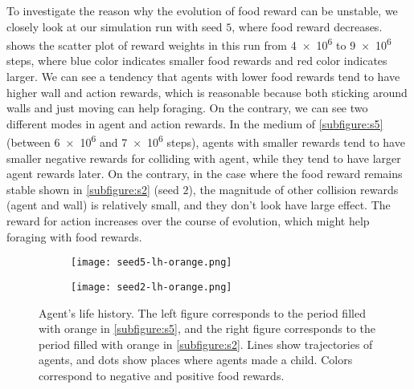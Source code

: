 To investigate the reason why the evolution of food reward can be unstable, we closely look at our simulation run with seed $5$, where food reward decreases.  shows the scatter plot of reward weights in this run from \num{4e6} to \num{9e6} steps, where blue color indicates smaller food rewards and red color indicates larger. We can see a tendency that agents with lower food rewards tend to have higher wall and action rewards, which is reasonable because both sticking around walls and just moving can help foraging. On the contrary, we can see two different modes in agent and action rewards. In the medium of \cref{subfigure:s5} (between \num{6e6} and \num{7e6} steps), agents with smaller rewards tend to have smaller negative rewards for colliding with agent, while they tend to have larger agent rewards later. On the contrary, in the case where the food reward remains stable shown in \cref{subfigure:s2} (seed $2$), the magnitude of other collision rewards (agent and wall) is relatively small, and they don't look have large effect. The reward for action increases over the course of evolution, which might help foraging with food rewards.

\begin{figure}[t]
  \begin{subfigure}[t]{7cm}
    \centering
    \texttt{[image: seed5-lh-orange.png]}
    \label{subfigure:s5lh}
  \end{subfigure}
  \begin{subfigure}[t]{7cm}
    \centering
    \texttt{[image: seed2-lh-orange.png]}
    \label{subfigure:s2lh}
  \end{subfigure}
  \caption{
    Agent's life history. The left figure corresponds to the period filled with orange in \cref{subfigure:s5}, and the right figure corresponds to the period filled with orange in \cref{subfigure:s2}. Lines show trajectories of agents, and dots show places where agents made a child. Colors correspond to negative and positive food rewards.
  }\label{figure:s5-lh}
\end{figure}

